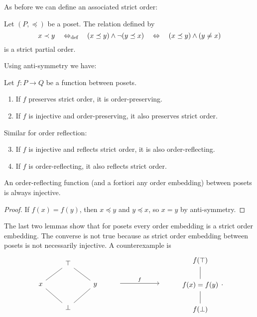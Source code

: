 As before we can define an associated strict order:
\begin{lemma}
Let $(P, \preceq)$ be a poset. The relation defined by
\[ x\prec y \quad\Leftrightarrow_{\text{def}}\quad (x\preceq y)\land \neg(y\preceq x) \quad \Leftrightarrow \quad (x\preceq y)\land (y\neq x) \]
is a strict partial order.
\end{lemma}

Using anti-symmetry we have:
\begin{lemma}
Let $f:P\to Q$ be a function between posets.
\begin{enumerate}
\item If $f$ preserves strict order, it is order-preserving.
\item If $f$ is injective and order-preserving, it also preserves strict order.
\end{enumerate}
Similar for order reflection:
\begin{enumerate}
\setcounter{enumi}{2}
\item If $f$ is injective and reflects strict order, it is also order-reflecting.
\item If $f$ is order-reflecting, it also reflects strict order.
\end{enumerate}
\end{lemma}
\begin{lemma} \label{lemma:orderReflectionIsInjective}
An order-reflecting function (and a fortiori any order embedding) between posets is always injective.
\end{lemma}
\begin{proof}
If $f(x) = f(y)$, then $x\preceq y$ and $y\preceq x$, so $x=y$ by anti-symmetry.
\end{proof}
The last two lemmas show that for posets every order embedding is a strict order embedding. The converse is not true because as strict order embedding between posets is not necessarily injective. A counterexample is
\[
\begin{tikzcd}
& \top & \\
x \ar[ur, dash] & & y \ar[ul, dash] \\
& \bot \ar[ul, dash] \ar[ur, dash] &
\end{tikzcd} \qquad \begin{tikzcd} {} \arrow[rr, "f"] & {}& {}\end{tikzcd} \qquad \begin{tikzcd}
f(\top) \\ f(x) = f(y) \ar[u,dash] \\ f(\bot) \ar[u,dash]
\end{tikzcd}.
\]

